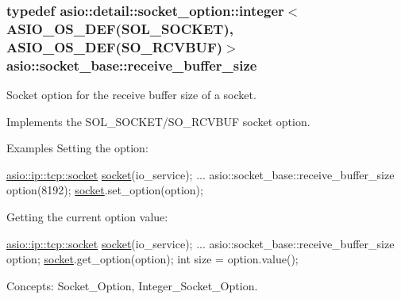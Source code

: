 \subsubsection[{receive\+\_\+buffer\+\_\+size}]{\setlength{\rightskip}{0pt plus 5cm}typedef {\bf asio\+::detail\+::socket\+\_\+option\+::integer}$<$ {\bf A\+S\+I\+O\+\_\+\+O\+S\+\_\+\+D\+E\+F}(S\+O\+L\+\_\+\+S\+O\+C\+K\+E\+T), {\bf A\+S\+I\+O\+\_\+\+O\+S\+\_\+\+D\+E\+F}(S\+O\+\_\+\+R\+C\+V\+B\+U\+F)$>$ {\bf asio\+::socket\+\_\+base\+::receive\+\_\+buffer\+\_\+size}}\label{classasio_1_1socket__base_a7d102a034ff7e2a71dfe6434c6ba0525}


Socket option for the receive buffer size of a socket. 

Implements the S\+O\+L\+\_\+\+S\+O\+C\+K\+E\+T/\+S\+O\+\_\+\+R\+C\+V\+B\+U\+F socket option.

\begin{DoxyParagraph}{Examples}
Setting the option\+: 
\begin{DoxyCode}
\hyperlink{classasio_1_1basic__stream__socket}{asio::ip::tcp::socket} \hyperlink{namespacewebsocketpp_1_1transport_1_1asio_1_1socket_1_1error_a828ddaa5ed63a761e1b557465a35f05aa0c31b356014843e1d09514e794a539a7}{socket}(io\_service); 
...
asio::socket\_base::receive\_buffer\_size option(8192);
\hyperlink{namespacewebsocketpp_1_1transport_1_1asio_1_1socket_1_1error_a828ddaa5ed63a761e1b557465a35f05aa0c31b356014843e1d09514e794a539a7}{socket}.set\_option(option);
\end{DoxyCode}

\end{DoxyParagraph}
\begin{DoxyParagraph}{}
Getting the current option value\+: 
\begin{DoxyCode}
\hyperlink{classasio_1_1basic__stream__socket}{asio::ip::tcp::socket} \hyperlink{namespacewebsocketpp_1_1transport_1_1asio_1_1socket_1_1error_a828ddaa5ed63a761e1b557465a35f05aa0c31b356014843e1d09514e794a539a7}{socket}(io\_service); 
...
asio::socket\_base::receive\_buffer\_size option;
\hyperlink{namespacewebsocketpp_1_1transport_1_1asio_1_1socket_1_1error_a828ddaa5ed63a761e1b557465a35f05aa0c31b356014843e1d09514e794a539a7}{socket}.get\_option(option);
\textcolor{keywordtype}{int} size = option.value();
\end{DoxyCode}

\end{DoxyParagraph}
\begin{DoxyParagraph}{Concepts\+:}
Socket\+\_\+\+Option, Integer\+\_\+\+Socket\+\_\+\+Option. 
\end{DoxyParagraph}


